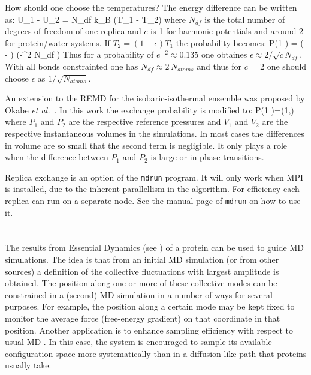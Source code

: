 {How should one choose the temperatures?
The energy difference can be written as:
\beq
U_1 - U_2 =  N_{df}  k_B (T_1 - T_2)
\eeq
where $N_{df}$ is the total number of degrees of freedom of one replica
and $c$ is 1 for harmonic potentials and around 2 for protein/water systems.
If $T_2 = (1+\epsilon) T_1$ the probability becomes:
\beq
P(1 )
  = \exp\left( - \right)
\approx \exp\left(-\epsilon^2  N_{df} \right)
\eeq
Thus for a probability of $e^{-2}\approx 0.135$
one obtaines $\epsilon \approx 2/\sqrt{c\,N_{df}}$.
With all bonds constrainted one has $N_{df} \approx 2\, N_{atoms}$
and thus for $c$ = 2 one should choose $\epsilon$ as $1/\sqrt{N_{atoms}}$.

An extension to the REMD for the isobaric-isothermal ensemble was
proposed by Okabe {\em et al.}~\cite{Okabe2001a}. In this work the
exchange probability is modified to:
\beq
P(1 )=\min\left(1,\exp{} \right)
\eeq
where $P_1$ and $P_2$ are the respective reference pressures and $V_1$ and
$V_2$ are the respective instantaneous volumes in the simulations.
In most cases the differences in volume are so small that the second
term is negligible. It only plays a role when the difference between
$P_1$ and $P_2$ is large or in phase transitions.

Replica exchange is an option of the {\tt mdrun} program. It will only
work when MPI is installed, due to the inherent parallellism in the
algorithm. For efficiency each replica can run on a separate node.
See the manual page of {\tt mdrun} on how to use it.


\section{}
The results from Essential Dynamics (see )
of a protein can be used to guide MD simulations. The idea is that
from an initial MD simulation (or from other sources) a definition of
the collective fluctuations with largest amplitude is obtained. The
position along one or more of these collective modes can be
constrained in a (second) MD simulation in a number of ways for
several purposes. For example, the position along a certain mode may
be kept fixed to monitor the average force (free-energy gradient) on
that coordinate in that position. Another application is to enhance
sampling efficiency with respect to usual MD
\cite{Degroot96a,Degroot96b}. In this case, the system is encouraged
to sample its available configuration space more systematically than
in a diffusion-like path that proteins usually take.

}
